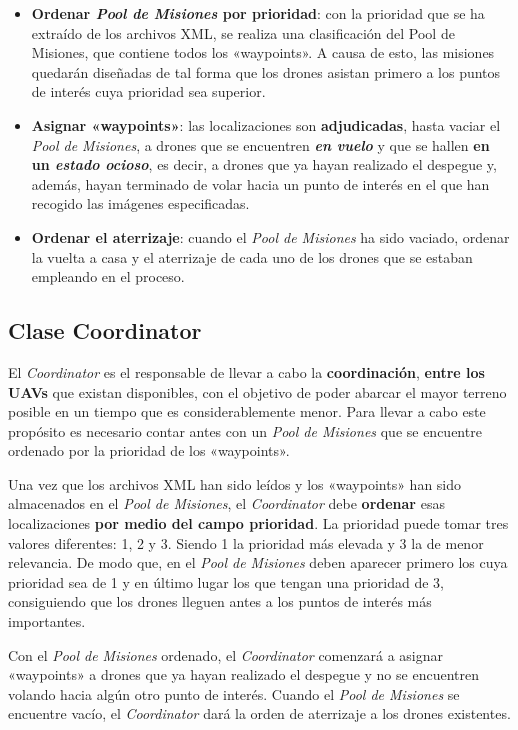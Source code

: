 \begin{itemize}
\item \textbf{Ordenar \textit{Pool de Misiones} por prioridad}: con la prioridad que se ha extraído de los archivos XML, se realiza una clasificación del Pool de Misiones, que contiene todos los «waypoints». A causa de esto, las misiones quedarán diseñadas de tal forma que los drones asistan primero a los puntos de interés cuya prioridad sea superior.
\item \textbf{Asignar «waypoints»}: las localizaciones son \textbf{adjudicadas}, hasta vaciar el \textit{Pool de Misiones}, a drones que se encuentren \textbf{\textit{en vuelo}} y que se hallen \textbf{en un \textit{estado ocioso}}, es decir, a drones que ya hayan realizado el despegue y, además, hayan terminado de volar hacia un punto de interés en el que han recogido las imágenes especificadas. 
\item \textbf{Ordenar el aterrizaje}: cuando el \textit{Pool de Misiones} ha sido vaciado, ordenar la vuelta a casa y el aterrizaje de cada uno de los drones que se estaban empleando en el proceso.
\end{itemize}

\subsection{Clase Coordinator}

El \textit{Coordinator} es el responsable de llevar a cabo la \textbf{coordinación}, \textbf{entre los \acs{UAV}s} que existan disponibles, con el objetivo de poder abarcar el mayor terreno posible en un tiempo que es considerablemente menor. Para llevar a cabo este propósito es necesario contar antes con un \textit{Pool de Misiones} que se encuentre ordenado por la prioridad de los «waypoints». 

Una vez que los archivos XML han sido leídos y los «waypoints» han sido almacenados en el \textit{Pool de Misiones}, el \textit{Coordinator} debe \textbf{ordenar} esas localizaciones \textbf{por medio del campo prioridad}. La prioridad puede tomar tres valores diferentes: 1, 2 y 3. Siendo 1 la prioridad más elevada y 3 la de menor relevancia. De modo que, en el \textit{Pool de Misiones} deben aparecer primero los  cuya prioridad sea de 1 y en último lugar los que tengan una prioridad de 3, consiguiendo que los drones lleguen antes a los puntos de interés más importantes.

Con el \textit{Pool de Misiones} ordenado, el \textit{Coordinator} comenzará a asignar «waypoints» a drones que ya hayan realizado el despegue y no se encuentren volando hacia algún otro punto de interés. Cuando el \textit{Pool de Misiones} se encuentre vacío, el \textit{Coordinator} dará la orden de aterrizaje a los drones existentes.

